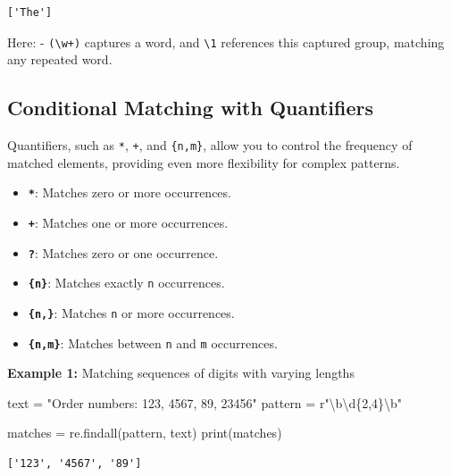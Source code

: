 \documentclass[
  letterpaper,
  DIV=11,
  numbers=noendperiod]{scrreprt}
\newenvironment{Shaded}{\begin{snugshade}}{\end{snugshade}}
\newcommand{\BuiltInTok}[1]{\textcolor[rgb]{0.00,0.23,0.31}{#1}}
\newcommand{\NormalTok}[1]{\textcolor[rgb]{0.00,0.23,0.31}{#1}}
\newcommand{\OperatorTok}[1]{\textcolor[rgb]{0.37,0.37,0.37}{#1}}
\newcommand{\StringTok}[1]{\textcolor[rgb]{0.13,0.47,0.30}{#1}}
\newcommand{\VerbatimStringTok}[1]{\textcolor[rgb]{0.13,0.47,0.30}{#1}}
\providecommand{\tightlist}{%
  \setlength{\itemsep}{0pt}\setlength{\parskip}{0pt}}\usepackage{longtable,booktabs,array}
\begin{document}
\begin{verbatim}
['The']
\end{verbatim}

Here: - \texttt{(\textbackslash{}w+)} captures a word, and
\texttt{\textbackslash{}1} references this captured group, matching any
repeated word.

\hypertarget{conditional-matching-with-quantifiers}{%
\subsection{Conditional Matching with
Quantifiers}\label{conditional-matching-with-quantifiers}}

Quantifiers, such as \texttt{*}, \texttt{+}, and \texttt{\{n,m\}}, allow
you to control the frequency of matched elements, providing even more
flexibility for complex patterns.

\begin{itemize}
\tightlist
\item
  \textbf{\texttt{*}}: Matches zero or more occurrences.
\item
  \textbf{\texttt{+}}: Matches one or more occurrences.
\item
  \textbf{\texttt{?}}: Matches zero or one occurrence.
\item
  \textbf{\texttt{\{n\}}}: Matches exactly \texttt{n} occurrences.
\item
  \textbf{\texttt{\{n,\}}}: Matches \texttt{n} or more occurrences.
\item
  \textbf{\texttt{\{n,m\}}}: Matches between \texttt{n} and \texttt{m}
  occurrences.
\end{itemize}

\textbf{Example 1:} Matching sequences of digits with varying lengths

\begin{Shaded}
\begin{Highlighting}[]
\NormalTok{text }\OperatorTok{=} \StringTok{"Order numbers: 123, 4567, 89, 23456"}
\NormalTok{pattern }\OperatorTok{=} \VerbatimStringTok{r"\textbackslash{}b\textbackslash{}d\{2,4\}\textbackslash{}b"}

\NormalTok{matches }\OperatorTok{=}\NormalTok{ re.findall(pattern, text)}
\BuiltInTok{print}\NormalTok{(matches)}
\end{Highlighting}
\end{Shaded}

\begin{verbatim}
['123', '4567', '89']
\end{verbatim}
\end{document}
